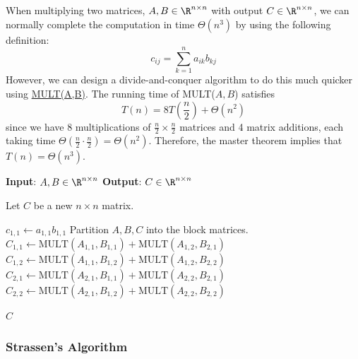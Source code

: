 When multiplying two matrices, \(A,B \in \R^{n \times n}\) with output \(C \in \R^{n \times n}\), we can normally complete the computation in time \(\Theta \left(n^3\right)\) by using the following definition:
\begin{equation}
    c_{ij} = \sum_{k=1}^{n} a_{ik} b_{kj}
\end{equation}
However, we can design a divide-and-conquer algorithm to do this much quicker using \hyperref[alg:mult]{MULT(A,B)}.
The running time of MULT(\(A,B\)) satisfies
\begin{equation}
    T(n) = 8 T \left(\frac{n}{2}\right) + \Theta \left(n^2\right)
\end{equation}
since we have 8 multiplications of \(\frac{n}{2} \times \frac{n}{2}\) matrices and 4 matrix additions, each taking time \(\Theta \left(\frac{n}{2} \cdot \frac{n}{2}\right) = \Theta\left(n^2\right)\).
Therefore, the master theorem implies that \(T(n) = \Theta \left(n^3\right)\).

\begin{algorithm}[H]
    \caption{MULT(A,B)}
    \begin{algorithmic}
        \State \textbf{Input}: \(A,B \in \R^{n \times n}\)
        \State \textbf{Output}: \(C \in \R^{n \times n}\)
        
        \State Let \(C\) be a new \(n \times n\) matrix.

            \State \(c_{1,1} \gets a_{1,1}b_{1,1}\)
        \Else
            \State Partition \(A,B,C\) into the block matrices.
            \State \(C_{1,1} \gets \text{MULT}(A_{1,1}, B_{1,1}) + \text{MULT}(A_{1,2}, B_{2,1})\)
            \State \(C_{1,2} \gets \text{MULT}(A_{1,1}, B_{1,2}) + \text{MULT}(A_{1,2}, B_{2,2})\)
            \State \(C_{2,1} \gets \text{MULT}(A_{2,1}, B_{1,1}) + \text{MULT}(A_{2,2}, B_{2,1})\)
            \State \(C_{2,2} \gets \text{MULT}(A_{2,1}, B_{1,2}) + \text{MULT}(A_{2,2}, B_{2,2})\)
        \EndIf

        \noindent\Return \(C\)
    \end{algorithmic}
    \label{alg:mult}
\end{algorithm}

\subsubsection{Strassen's Algorithm}

